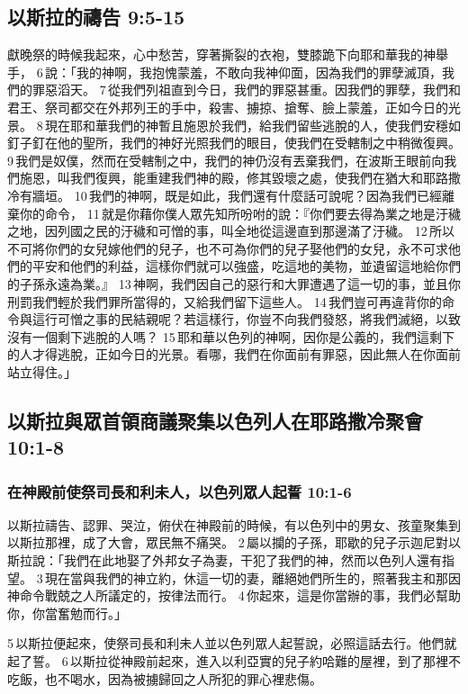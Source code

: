 \subsection{以斯拉的禱告 9:5-15}
獻晚祭的時候我起來，心中愁苦，穿著撕裂的衣袍，雙膝跪下向耶和華我的神舉手， 6 說：「我的神啊，我抱愧蒙羞，不敢向我神仰面，因為我們的罪孽滅頂，我們的罪惡滔天。 7 從我們列祖直到今日，我們的罪惡甚重。因我們的罪孽，我們和君王、祭司都交在外邦列王的手中，殺害、擄掠、搶奪、臉上蒙羞，正如今日的光景。 8 現在耶和華我們的神暫且施恩於我們，給我們留些逃脫的人，使我們安穩如釘子釘在他的聖所，我們的神好光照我們的眼目，使我們在受轄制之中稍微復興。 9 我們是奴僕，然而在受轄制之中，我們的神仍沒有丟棄我們，在波斯王眼前向我們施恩，叫我們復興，能重建我們神的殿，修其毀壞之處，使我們在猶大和耶路撒冷有牆垣。 10 我們的神啊，既是如此，我們還有什麼話可說呢？因為我們已經離棄你的命令， 11 就是你藉你僕人眾先知所吩咐的說：『你們要去得為業之地是汙穢之地，因列國之民的汙穢和可憎的事，叫全地從這邊直到那邊滿了汙穢。 12 所以不可將你們的女兒嫁他們的兒子，也不可為你們的兒子娶他們的女兒，永不可求他們的平安和他們的利益，這樣你們就可以強盛，吃這地的美物，並遺留這地給你們的子孫永遠為業。』 13 神啊，我們因自己的惡行和大罪遭遇了這一切的事，並且你刑罰我們輕於我們罪所當得的，又給我們留下這些人。 14 我們豈可再違背你的命令與這行可憎之事的民結親呢？若這樣行，你豈不向我們發怒，將我們滅絕，以致沒有一個剩下逃脫的人嗎？ 15 耶和華以色列的神啊，因你是公義的，我們這剩下的人才得逃脫，正如今日的光景。看哪，我們在你面前有罪惡，因此無人在你面前站立得住。」

\subsection{以斯拉與眾首領商議聚集以色列人在耶路撒冷聚會 10:1-8}
\subsubsection{在神殿前使祭司長和利未人，以色列眾人起誓 10:1-6}
以斯拉禱告、認罪、哭泣，俯伏在神殿前的時候，有以色列中的男女、孩童聚集到以斯拉那裡，成了大會，眾民無不痛哭。 2 屬以攔的子孫，耶歇的兒子示迦尼對以斯拉說：「我們在此地娶了外邦女子為妻，干犯了我們的神，然而以色列人還有指望。 3 現在當與我們的神立約，休這一切的妻，離絕她們所生的，照著我主和那因神命令戰兢之人所議定的，按律法而行。 4 你起來，這是你當辦的事，我們必幫助你，你當奮勉而行。」

5 以斯拉便起來，使祭司長和利未人並以色列眾人起誓說，必照這話去行。他們就起了誓。 6 以斯拉從神殿前起來，進入以利亞實的兒子約哈難的屋裡，到了那裡不吃飯，也不喝水，因為被擄歸回之人所犯的罪心裡悲傷。

